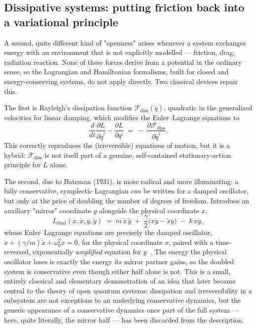 \subsection{Dissipative systems: putting friction back into a
  variational principle}

A second, quite different kind of "openness" arises whenever a
system exchanges energy with an environment that is not explicitly
modelled --- friction, drag, radiation reaction. None of these
forces derive from a potential in the ordinary sense, so the
Lagrangian and Hamiltonian formalisms, built for closed and
energy-conserving systems, do not apply directly. Two classical
devices repair this.

The first is Rayleigh's dissipation function $\mathcal
F_{\mathrm{diss}}(\dot q)$, quadratic in the generalized velocities
for linear damping, which modifies the Euler--Lagrange equations to
\begin{equation}
  \frac{d}{dt}\frac{\partial L}{\partial \dot q^i}
  - \frac{\partial L}{\partial q^i}
  \;=\; -\,\frac{\partial \mathcal F_{\mathrm{diss}}}{\partial \dot
  q^i}.
  \label{eq:rayleigh}
\end{equation}
This correctly reproduces the (irreversible) equations of motion,
but it is a hybrid: $\mathcal F_{\mathrm{diss}}$ is not itself part
of a genuine, self-contained stationary-action principle for $L$
alone.

The second, due to Bateman (1931), is more radical and more
illuminating: a fully conservative, symplectic Lagrangian \emph{can}
be written for a damped oscillator, but only at the price of
doubling the number of degrees of freedom. Introduce an auxiliary
"mirror" coordinate $y$ alongside the physical coordinate $x$,
\begin{equation}
  L_{\mathrm{dual}}(x,\dot x,y,\dot y) \;=\;
  m\,\dot x\,\dot y \;+\; \frac{\gamma}{2}\bigl(x\dot y - \dot x
  y\bigr) \;-\; k\,xy ,
  \label{eq:bateman}
\end{equation}
whose Euler--Lagrange equations are precisely the damped oscillator,
$\ddot x + (\gamma/m)\dot x + \omega_0^2 x = 0$, for the physical
coordinate $x$, paired with a time-reversed, exponentially
\emph{amplified} equation for $y$~\cite{Bateman1931}. The energy the
physical oscillator loses is exactly the energy its mirror partner
gains, so the doubled system is conservative even though either half
alone is not. This is a small, entirely classical and elementary
demonstration of an idea that later became central to the theory of
open quantum systems: dissipation and irreversibility in a subsystem
are not exceptions to an underlying conservative dynamics, but the
generic appearance of a conservative dynamics once part of the full
system --- here, quite literally, the mirror half --- has been
discarded from the description.

